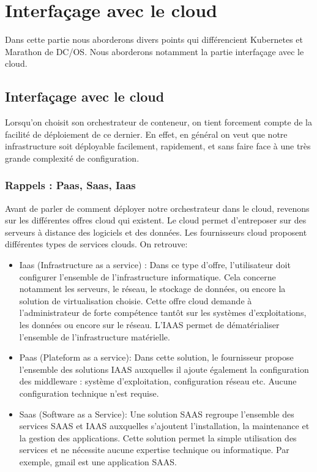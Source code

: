 \documentclass[11pt,fleqn]{book} %
\begin{document}
\chapter{Interfaçage avec le cloud }
\vspace{-2cm}
Dans cette partie nous aborderons divers points qui différencient Kubernetes et Marathon de DC/OS. Nous aborderons notamment la partie interfaçage avec le cloud.

\section*{Interfaçage avec le cloud}
Lorsqu'on choisit son orchestrateur de conteneur, on tient forcement compte de la facilité de déploiement de ce dernier. En effet, en général on veut que notre infrastructure soit déployable facilement, rapidement, et sans faire face à une très grande complexité de configuration.

\subsection*{Rappels : Paas, Saas, Iaas}
Avant de parler de comment déployer notre orchestrateur dans le cloud, revenons sur les différentes offres cloud qui existent. Le cloud permet d’entreposer sur des serveurs à distance des logiciels et des données. Les fournisseurs cloud proposent différentes types de services clouds. On retrouve:
\begin{itemize}
    \item Iaas (Infrastructure as a service) : Dans ce type d'offre, l'utilisateur doit configurer l'ensemble de l'infrastructure informatique. Cela concerne notamment les serveurs, le réseau, le stockage de données, ou encore la solution de virtualisation choisie. Cette offre cloud demande à l'administrateur de forte compétence tantôt sur les systèmes d'exploitations, les données ou encore sur le réseau. L'IAAS permet de dématérialiser l'ensemble de l'infrastructure matérielle.
    \item Paas (Plateform as a service): Dans cette solution, le fournisseur propose l'ensemble des solutions IAAS auxquelles il ajoute également la configuration des middleware : système d'exploitation, configuration réseau etc. Aucune configuration technique n'est requise.
    \item Saas (Software as a Service): Une solution SAAS regroupe l'ensemble des services SAAS et IAAS auxquelles s'ajoutent l'installation, la maintenance et la gestion des applications. Cette solution permet la simple utilisation des services et ne nécessite aucune expertise technique ou informatique. Par exemple, gmail est une application SAAS.\\
\end{itemize}
\end{document}
